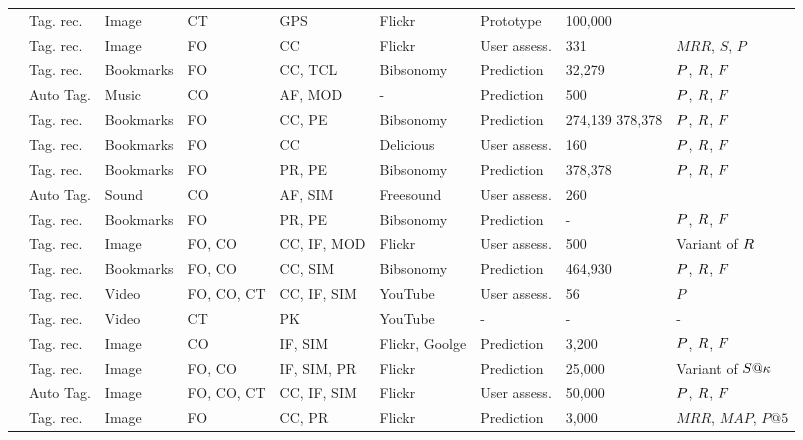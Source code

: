 \begin{table}
\begin{threeparttable}
\begin{tabular}{@{}p{3.0cm}p{1.35cm}P{2.3cm}P{1.6cm}P{2.3cm}p{1.6cm}p{1.45cm}T{1.0cm}p{2.5cm}@{}}
\cite{Naaman2008} & Tag. rec. & Image & CT & GPS & Flickr & Prototype & 100,000 &  \\
\cite{Sigurbjornsson2008} & Tag. rec. & Image & FO & CC & Flickr & User assess. & 331 & $MRR$, $S$, $P$ \\
\cite{Song2008} & Tag. rec. & Bookmarks & FO & CC, TCL & Bibsonomy & Prediction & 32,279 & $P$, $R$, $F$ \\
\cite{turnbull2008} & Auto Tag. & Music & CO & AF, MOD & - & Prediction & 500 & $P$, $R$, $F$ \\
\cite{Cao2009} & Tag. rec. & Bookmarks & FO & CC, PE & Bibsonomy & Prediction & 274,139 378,378 & $P$, $R$, $F$ \\
\cite{meo2009} & Tag. rec. & Bookmarks & FO & CC & Delicious & User assess. & 160 & $P$, $R$, $F$ \\
\cite{Marinho2009} & Tag. rec. & Bookmarks & FO & PR, PE & Bibsonomy & Prediction & 378,378 & $P$, $R$, $F$ \\
\cite{martinez2009} & Auto Tag. & Sound & CO & AF, SIM & Freesound & User assess. & 260 &  \\
\cite{Rendle2009} & Tag. rec. & Bookmarks & FO & PR, PE & Bibsonomy & Prediction & - & $P$, $R$, $F$ \\
\cite{Wu2009} & Tag. rec. & Image & FO, CO & CC, IF, MOD & Flickr & User assess. & 500 & Variant of $R$ \\
\cite{Zhang2009} & Tag. rec. & Bookmarks & FO, CO & CC, SIM & Bibsonomy & Prediction & 464,930 & $P$, $R$, $F$ \\
\cite{Ballan2010} & Tag. rec. & Video & FO, CO, CT & CC, IF, SIM & YouTube & User assess. & 56 & $P$ \\
\cite{Chen2010} & Tag. rec. & Video & CT & PK & YouTube & - & - & - \\
\cite{ivanov2010} & Tag. rec. & Image & CO & IF, SIM & Flickr, Goolge & Prediction & 3,200 & $P$, $R$, $F$ \\
\cite{Lee2010} & Tag. rec. & Image & FO, CO & IF, SIM, PR & Flickr & Prediction & 25,000 & Variant of $S@\kappa$ \\
\cite{Liu2010a} & Auto Tag. & Image & FO, CO, CT & CC, IF, SIM & Flickr & User assess. & 50,000 & $P$, $R$, $F$ \\
\cite{Rae2010} & Tag. rec. & Image & FO & CC, PR & Flickr & Prediction & 3,000 & $MRR$, $MAP$, $P@5$ \\

\end{tabular}
\end{threeparttable}
\end{table}
